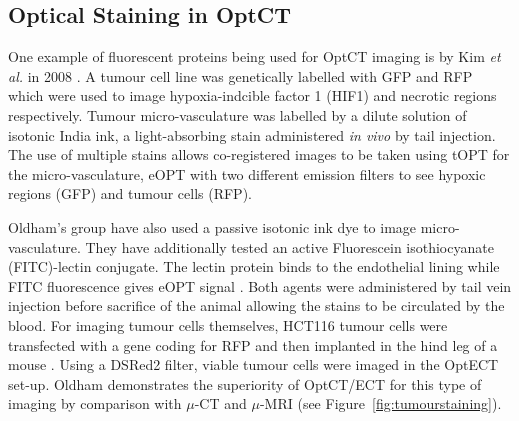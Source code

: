 \documentclass[12pt]{article}
\begin{document}
\subsection{Optical Staining in OptCT}

One example of fluorescent proteins being used for OptCT imaging is by Kim \textit{et al.} in 2008 \cite{Kim:2008eua}. A tumour cell line was genetically labelled with GFP and RFP which were used to image hypoxia-indcible factor 1 (HIF1) and necrotic regions respectively. Tumour micro-vasculature was labelled by a dilute solution of isotonic India ink, a light-absorbing stain administered \textit{in vivo} by tail injection. The use of multiple stains allows co-registered images to be taken using tOPT for the micro-vasculature, eOPT with two different emission filters to see hypoxic regions (GFP) and tumour cells (RFP). 







Oldham's group have also used a passive isotonic ink dye to image micro-vasculature. They have additionally tested an active  Fluorescein isothiocyanate (FITC)-lectin conjugate. The lectin protein binds to the endothelial lining while FITC fluorescence gives eOPT signal \cite{Oldham:2007ku}. Both agents were administered by tail vein injection before sacrifice of the animal allowing the stains to be circulated by the blood.  For imaging tumour cells themselves, HCT116 tumour cells were transfected with a gene coding for RFP and then implanted in the hind leg of a mouse \cite{Oldham:2006}. Using a DSRed2 filter, viable tumour cells were imaged in the OptECT set-up. Oldham demonstrates the superiority of OptCT/ECT for this type of imaging by comparison with $\mu$-CT and $\mu$-MRI (see Figure~\ref{fig:tumourstaining}).
\end{document}
